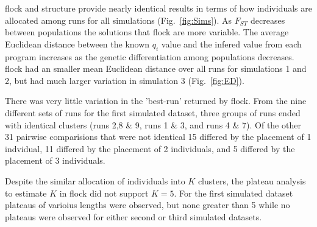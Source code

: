 {\sc flock} and {\sc structure} provide nearly identical results in 
terms of how individuals are allocated among runs for 
all simulations (Fig.~\ref{fig:Sims}). As $F_{ST}$ decreases 
between populations the solutions that {\sc flock} are more variable. 
The average Euclidean distance between the known $q_i$ value and 
the infered value from each program increases as the genetic 
differentiation among populations decreases. {\sc flock} had an 
smaller mean Euclidean distance over all runs for simulations 
1 and 2, but had much larger variation in simulation 3 (Fig.~\ref{fig:ED}).
 
There was very little variation in the 'best-run' returned by {\sc flock}. 
From the nine different sets of runs for the first simulated dataset, 
three groups of runs ended with 
identical clusters (runs 2,8 \& 9, runs 1 \& 3, and runs 4 \& 7). 
Of the other 31 pairwise comparisions that were not identical
15 differed by the placement of 1 indvidual, 11 differed by the placement
of 2 individuals, and 5 differed by the placement of 3 individuals. 

Despite the similar allocation of individuals into $K$ clusters, the 
plateau analysis to estimate $K$ in {\sc flock} did not support $K = 5$. 
For the first simulated dataset plateaus of varioius lengths were observed, 
but none greater than 5 while no plateaus were observed for either second or 
third simulated datasets.

